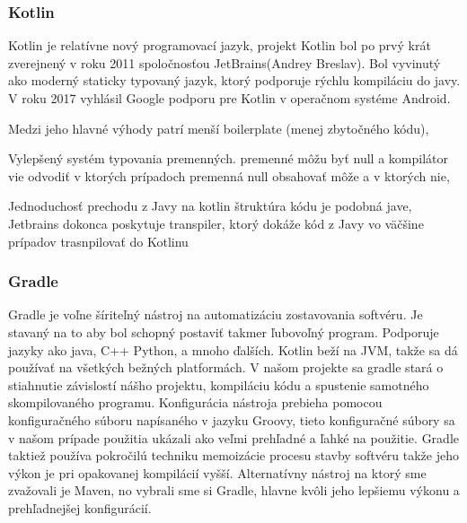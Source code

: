   

\subsubsection{Kotlin} 

 Kotlin je relatívne nový programovací jazyk, projekt Kotlin bol po prvý krát zverejnený v roku 2011 spoločnosťou JetBrains(Andrey Breslav). Bol vyvinutý ako moderný staticky typovaný jazyk, ktorý podporuje rýchlu kompiláciu do javy. V roku 2017 vyhlásil Google podporu pre Kotlin v operačnom systéme Android.  

Medzi jeho hlavné výhody patrí menší boilerplate (menej zbytočného kódu),  

Vylepšený systém typovania premenných. premenné môžu byť null a kompilátor vie odvodiť v ktorých prípadoch premenná null obsahovať môže a v ktorých nie,  

  

Jednoduchosť prechodu z Javy na kotlin štruktúra kódu je podobná jave, Jetbrains dokonca poskytuje transpiler, ktorý dokáže kód z Javy vo väčšine prípadov trasnpilovať do Kotlinu 


  

\subsubsection{Gradle} 

Gradle je voľne šíriteľný nástroj na automatizáciu zostavovania softvéru. Je stavaný na to aby bol schopný postaviť takmer ľubovoľný program. Podporuje jazyky ako java, C++ Python, a mnoho ďalších. Kotlin beží na JVM, takže sa dá používať na všetkých bežných platformách. V našom projekte sa gradle stará o stiahnutie závislostí nášho projektu, kompiláciu kódu a spustenie samotného skompilovaného programu. Konfigurácia nástroja prebieha pomocou konfiguračného súboru napísaného v jazyku Groovy, tieto konfiguračné  súbory sa v našom prípade použitia ukázali ako veľmi prehľadné a ľahké na použitie. Gradle taktiež používa pokročilú techniku memoizácie procesu stavby softvéru takže jeho výkon je pri opakovanej kompilácií vyšší. Alternatívny nástroj na ktorý sme zvažovali je Maven, no vybrali sme si Gradle, hlavne kvôli jeho lepšiemu výkonu a prehľadnejšej konfigurácií. 

  


  

  

